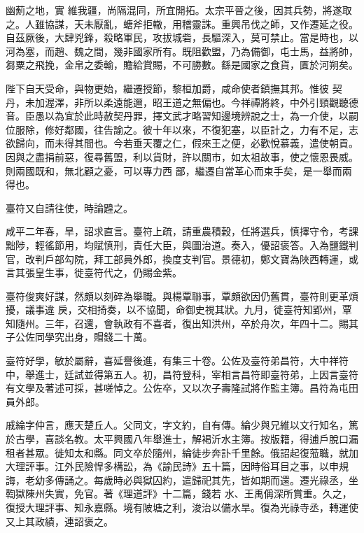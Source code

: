 \begin{pinyinscope}
 幽薊之地，實
 維我疆，尚隔混同，所宜開拓。太宗平晉之後，因其兵勢，將遂取之。人雖協謀，天未厭亂，螗斧拒轍，用稽靈誅。重興吊伐之師，又作遷延之役。自茲厥後，大肆兇鋒，殺略軍民，攻拔城砦，長驅深入，莫可禁止。當是時也，以河為塞，而趙、魏之間，幾非國家所有。既阻歡盟，乃為備御，屯士馬，益將帥，芻粟之飛挽，金帛之委輸，贍給賞賜，不可勝數。繇是國家之食貨，匱於河朔矣。



 陛下自天受命，與物更始，繼遷授節，黎桓加爵，咸命使者鎮撫其邦。惟彼
 契丹，未加渥澤，非所以柔遠能邇，昭王道之無偏也。今祥禫將終，中外引頸觀聽德音。臣愚以為宜於此時赦契丹罪，擇文武才略習知邊境辨說之士，為一介使，以嗣位服除，修好鄰國，往告諭之。彼十年以來，不復犯塞，以臣計之，力有不足，志欲歸向，而未得其間也。今若垂天覆之仁，假來王之便，必歡悅慕義，遣使朝貢。因與之盡捐前惡，復尋舊盟，利以貨財，許以關市，如太祖故事，使之懷恩畏威。則兩國既和，無北顧之憂，可以專力西
 鄙，繼遷自當革心而束手矣，是一舉而兩得也。



 臺符又自請往使，時論韙之。



 咸平二年春，旱，詔求直言。臺符上疏，請重農積穀，任將選兵，慎擇守令，考課黜陟，輕徭節用，均賦慎刑，責任大臣，與圖治道。奏入，優詔褒答。入為鹽鐵判官，改判戶部勾院，拜工部員外郎，換度支判官。景德初，鄭文寶為陜西轉運，或言其張皇生事，徙臺符代之，仍賜金紫。



 臺符俊爽好謀，然頗以刻碎為舉職。與楊覃聯事，覃頗欲因仍舊貫，臺符則更革煩擾，議事違
 戾，交相掎奏，以不協聞，命御史視其狀。九月，徙臺符知郢州，覃知隨州。三年，召還，會執政有不喜者，復出知洪州，卒於舟次，年四十二。賜其子公佐同學究出身，賵錢二十萬。



 臺符好學，敏於屬辭，喜延譽後進，有集三十卷。公佐及臺符弟昌符，大中祥符中，舉進士，廷試並得第五人。初，昌符登科，宰相言昌符即臺符弟，上因言臺符有文學及著述可採，甚嗟悼之。公佐卒，又以次子壽隆試將作監主簿。昌符為屯田員外郎。



 戚綸字仲言，應天楚丘人。父同文，字文約，自有傳。綸少與兄維以文行知名，篤於古學，喜談名教。太平興國八年舉進士，解褐沂水主簿。按版籍，得逋戶脫口漏租者甚眾。徙知太和縣。同文卒於隨州，綸徒步奔訃千里餘。俄詔起復蒞職，就加大理評事。江外民險悍多構訟，為《諭民詩》五十篇，因時俗耳目之事，以申規誨，老幼多傳誦之。每歲時必與獄囚約，遣歸祀其先，皆如期而還。遷光祿丞，坐鞫獄陳州失實，免官。著《理道評》十二篇，錢若
 水、王禹偁深所賞重。久之，復授大理評事、知永嘉縣。境有陂塘之利，浚治以備水旱。復為光祿寺丞，轉運使又上其政績，連詔褒之。




\end{pinyinscope}

